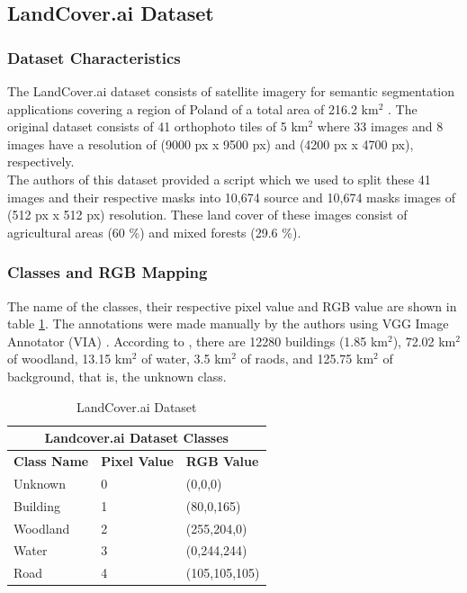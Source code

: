 \documentclass[sigconf, nonacm]{acmart}
\begin{document}
\subsection{LandCover.ai Dataset}



\subsubsection{Dataset Characteristics}
The LandCover.ai dataset consists of satellite imagery for semantic segmentation applications covering a region of Poland of a total area of 216.2 km$^2$ \cite{DBLP:journals/corr/abs-2005-02264}. The original dataset consists of 41 orthophoto tiles of 5 km$^2$ where 33 images and 8 images have a resolution of (9000 px x 9500 px) and (4200 px x 4700 px), respectively. \\ \indent
The authors of this dataset \cite{DBLP:journals/corr/abs-2005-02264} provided a script which we used to split these 41 images and their respective masks into 10,674 source and 10,674 masks images of (512 px x 512 px) resolution. These land cover of these images consist of agricultural areas (60 \%) and mixed forests (29.6 \%). \\ \indent



\subsubsection{Classes and RGB Mapping}
The name of the classes, their respective pixel value and RGB value are shown in table \ref{landcover_ai_classes}. The annotations were made manually by the authors using VGG  Image Annotator (VIA) \cite{dutta2019vgg}. According to \cite{DBLP:journals/corr/abs-2005-02264}, there are 12280 buildings (1.85 km$^2$), 72.02 km$^2$ of woodland, 13.15 km$^2$ of water, 3.5 km$^2$ of raods, and 125.75 km$^2$ of background, that is, the unknown class.

\begin{table}[htbp]
\centering
\caption{LandCover.ai Dataset}
\begin{tabular}{|p{1.2cm}|p{0.7cm}|p{1.6cm}|}
 \hline
 \multicolumn{3}{|c|}{\textbf{Landcover.ai Dataset Classes}} \\
 \hline
 \textbf{Class Name} & \textbf{Pixel Value}& \textbf{RGB Value} \\
 \hline
 Unknown & 0  & (0,0,0)\\ 
 \hline
 Building & 1  & (80,0,165)\\ 
 \hline
 Woodland & 2  & (255,204,0)\\ 
 \hline
 Water & 3  & (0,244,244)\\ 
 \hline
 Road & 4  & (105,105,105)\\ 
 \hline
\end{tabular}
\label{landcover_ai_classes}
\end{table}
\end{document}

